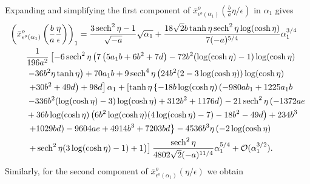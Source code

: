 Expanding and simplifying the first component of
$\bar{x}_{\epsilon^o(\alpha_1)}^o(\frac{b}{a}\eta/\epsilon)$ in $\alpha_1$
gives
\begin{equation*}
    \begin{aligned}
        &\left(\bar x_{\epsilon^o(\alpha_1)}^o\left(\frac{b}{a}\frac{\eta}{\epsilon}\right)\right)_1 
        = \frac{3 \operatorname{sech}^2\eta-1}{\sqrt{-a}} \sqrt{\alpha_1} +\frac{18 \sqrt{2} b \tanh \eta \operatorname{sech}^2\eta \log (\cosh \eta)}{7 (-a)^{5/4}} \alpha_1^{3/4} \\
        &\qquad \frac{1}{196 a^2}\left[-6 \operatorname{sech}^2\eta \left(7 \left(5 a_1 b+6 b^2+7 d\right)-72 b^2 (\log (\cosh\eta)-1)\log (\cosh\eta) \right. \right. \\ 
        &\qquad \left. -36 b^2 \eta \tanh \eta\right)+70 a_1 b + 9 \operatorname{sech}^4\eta \left(24 b^2 (2-3 \log (\cosh\eta )) \log (\cosh\eta) \right. \\
        &\qquad \left. \left. +30 b^2+49 d\right)+98 d \right] \alpha_1 + \left[ \tanh \eta \left\{-18 b \log (\cosh \eta) \left(-980 a b_1+1225 a_1 b\right. \right. \right. \\ 
        &\qquad \left. -336 b^2(\log (\cosh \eta)-3) \log (\cosh \eta) +312 b^2+1176 d\right)-21 \operatorname{sech}^2\eta \left(-1372 a e \right. \\
        &\qquad +36 b \log (\cosh \eta) \left(6 b^2 \log (\cosh \eta) (4 \log (\cosh \eta)-7)-18 b^2-49 d\right)+234 b^3 \\
        &\qquad \left. \left. +1029 b d\right)-9604 a e+4914 b^3+7203 b d\right\} -4536 b^3 \eta  \left(-2 \log (\cosh \eta) \right. \\
        &\qquad \left. \left.+\operatorname{sech}^2\eta (3 \log (\cosh \eta)-1)+1\right)\right] \frac{\operatorname{sech}^2\eta}{4802 \sqrt{2} (-a)^{11/4}} \alpha_1^{5/4}
            + \mathcal{O}(\alpha_1^{3/2}).
    \end{aligned}
\end{equation*}
Similarly, for the second component of $\bar x_{\epsilon^o(\alpha_1)}^o(\eta/\epsilon)$ we obtain
